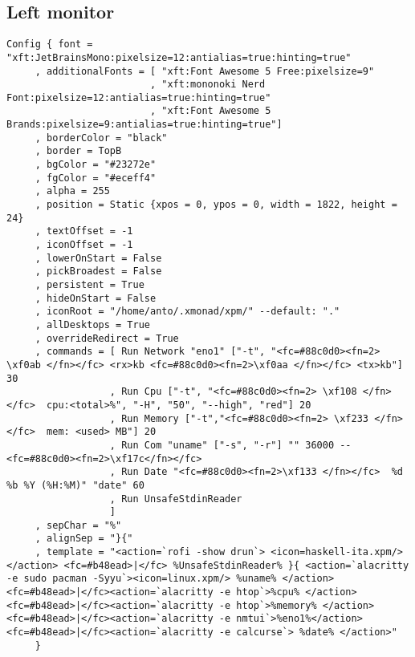 \documentclass[11pt]{article}
\begin{document}
\subsection{Left monitor}
\label{sec:orgfce48ab}
\begin{verbatim}
Config { font = "xft:JetBrainsMono:pixelsize=12:antialias=true:hinting=true"
     , additionalFonts = [ "xft:Font Awesome 5 Free:pixelsize=9"
                         , "xft:mononoki Nerd Font:pixelsize=12:antialias=true:hinting=true"
                         , "xft:Font Awesome 5 Brands:pixelsize=9:antialias=true:hinting=true"]
     , borderColor = "black"
     , border = TopB
     , bgColor = "#23272e"
     , fgColor = "#eceff4"
     , alpha = 255
     , position = Static {xpos = 0, ypos = 0, width = 1822, height = 24}
     , textOffset = -1
     , iconOffset = -1
     , lowerOnStart = False
     , pickBroadest = False
     , persistent = True
     , hideOnStart = False
     , iconRoot = "/home/anto/.xmonad/xpm/" --default: "."
     , allDesktops = True
     , overrideRedirect = True
     , commands = [ Run Network "eno1" ["-t", "<fc=#88c0d0><fn=2> \xf0ab </fn></fc> <rx>kb <fc=#88c0d0><fn=2>\xf0aa </fn></fc> <tx>kb"] 30
                  , Run Cpu ["-t", "<fc=#88c0d0><fn=2> \xf108 </fn></fc>  cpu:<total>%", "-H", "50", "--high", "red"] 20
                  , Run Memory ["-t","<fc=#88c0d0><fn=2> \xf233 </fn></fc>  mem: <used> MB"] 20
                  , Run Com "uname" ["-s", "-r"] "" 36000 -- <fc=#88c0d0><fn=2>\xf17c</fn></fc>
                  , Run Date "<fc=#88c0d0><fn=2>\xf133 </fn></fc>  %d %b %Y (%H:%M)" "date" 60 
                  , Run UnsafeStdinReader 
                  ]
     , sepChar = "%"
     , alignSep = "}{"
     , template = "<action=`rofi -show drun`> <icon=haskell-ita.xpm/></action> <fc=#b48ead>|</fc> %UnsafeStdinReader% }{ <action=`alacritty -e sudo pacman -Syyu`><icon=linux.xpm/> %uname% </action> <fc=#b48ead>|</fc><action=`alacritty -e htop`>%cpu% </action><fc=#b48ead>|</fc><action=`alacritty -e htop`>%memory% </action><fc=#b48ead>|</fc><action=`alacritty -e nmtui`>%eno1%</action> <fc=#b48ead>|</fc><action=`alacritty -e calcurse`> %date% </action>"
     }
\end{verbatim}
\end{document}
